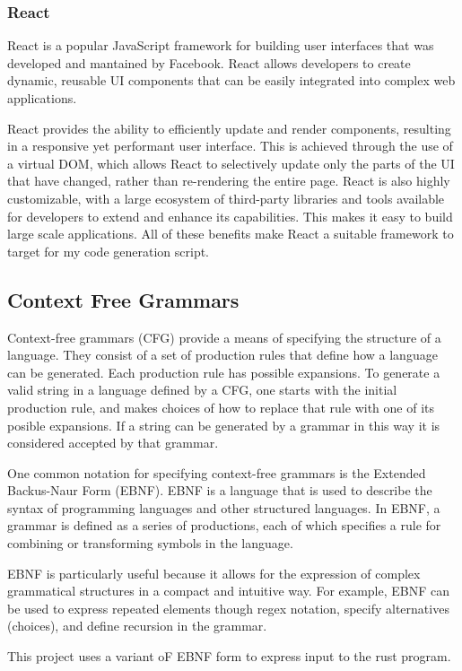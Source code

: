 \documentclass[hidelinks,12pt]{article}
\begin{document}
\begin{doublespacing}
\subsubsection*{React}
React is a popular JavaScript framework for building user interfaces that was developed and mantained by Facebook. React allows developers to create dynamic, reusable UI components that can be easily integrated into complex web applications.

React provides the ability to efficiently update and render components, resulting in a responsive yet performant user interface. This is achieved through the use of a virtual DOM, which allows React to selectively update only the parts of the UI that have changed, rather than re-rendering the entire page. React is also highly customizable, with a large ecosystem of third-party libraries and tools available for developers to extend and enhance its capabilities. This makes it easy to build large scale applications. All of these benefits make React a suitable framework to target for my code generation script.
\cite{venkat_sai_indla_review_2021}
\subsection{Context Free Grammars}
Context-free grammars (CFG) provide a means of specifying the structure of a language. They consist of a set of production rules that define how a language can be generated. Each production rule has possible expansions. To generate a valid string in a language defined by a CFG, one starts with the initial production rule, and makes choices of how to replace that rule with one of its posible expansions. If a string can be generated by a grammar in this way it is considered accepted by that grammar.

One common notation for specifying context-free grammars is the Extended Backus-Naur Form (EBNF). EBNF is a language that is used to describe the syntax of programming languages and other structured languages. In EBNF, a grammar is defined as a series of productions, each of which specifies a rule for combining or transforming symbols in the language.

EBNF is particularly useful because it allows for the expression of complex grammatical structures in a compact and intuitive way. For example, EBNF can be used to express repeated elements though regex notation, specify alternatives (choices), and define recursion in the grammar.
\cite{pattis_ebnf_nodate}

This project uses a variant oF EBNF form to express input to the rust program.

\end{doublespacing}
\end{document}
